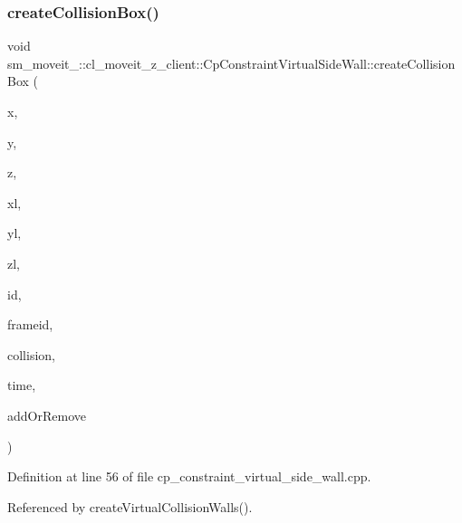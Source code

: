 \subsubsection{\texorpdfstring{create\+Collision\+Box()}{createCollisionBox()}}
{\footnotesize\ttfamily void sm\+\_\+moveit\+\_\+::cl\+\_\+moveit\+\_\+z\+\_\+client\+::\+Cp\+Constraint\+Virtual\+Side\+Wall\+::create\+Collision\+Box (\begin{DoxyParamCaption}\item[{float}]{x,  }\item[{float}]{y,  }\item[{float}]{z,  }\item[{float}]{xl,  }\item[{float}]{yl,  }\item[{float}]{zl,  }\item[{std\+::string}]{id,  }\item[{std\+::string}]{frameid,  }\item[{moveit\+\_\+msgs\+::\+Collision\+Object \&}]{collision,  }\item[{const ros\+::\+Time \&}]{time,  }\item[{int}]{add\+Or\+Remove }\end{DoxyParamCaption})}



Definition at line 56 of file cp\+\_\+constraint\+\_\+virtual\+\_\+side\+\_\+wall.\+cpp.



Referenced by create\+Virtual\+Collision\+Walls().


